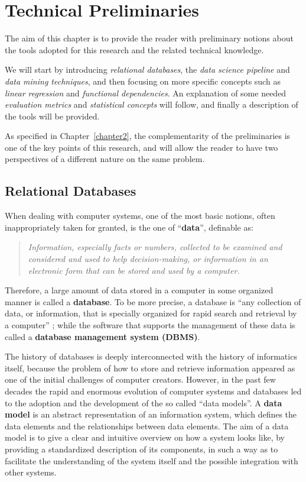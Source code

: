 \chapter{Technical Preliminaries}
\label{chapter4}
\thispagestyle{empty}

The aim of this chapter is to provide the reader with preliminary notions about the tools adopted for this research and the related technical knowledge.

We will start by introducing \textit{relational databases}, the \textit{data science pipeline} and \textit{data mining techniques}, and then focusing on more specific concepts such as \textit{linear regression} and \textit{functional dependencies}. An explanation of some needed \textit{evaluation metrics} and \textit{statistical concepts} will follow, and finally a description of the tools will be provided.

As specified in Chapter~\ref{chapter2}, the complementarity of the preliminaries is one of the key points of this research, and will allow the reader to have two perspectives of a different nature on the same problem.


\section{Relational Databases}
\label{section:relational_databases}
When dealing with computer systems, one of the most basic notions, often inappropriately taken for granted, is the one of ``\textbf{data}'', definable as:
\begin{quote}\emph{Information, especially facts or numbers, collected to be examined and considered and used to help decision-making, or information in an electronic form that can be stored and used by a computer.} \cite{cambridge2013data}\end{quote}
Therefore, a large amount of data stored in a computer in some organized manner is called a \textbf{database}. To be more precise, a database is ``any collection of data, or information, that is specially organized for rapid search and retrieval by a computer'' \cite{britannica2020database}; while the software that supports the management of these data is called a \textbf{database management system (DBMS)}.

The history of databases is deeply interconnected with the history of informatics itself, because the problem of how to store and retrieve information appeared as one of the initial challenges of computer creators. However, in the past few decades the rapid and enormous evolution of computer systems and databases led to the adoption and the development of the so called ``data models''. A \textbf{data model} \cite{abiteboul1995foundations} is an abstract representation of an information system, which defines the data elements and the relationships between data elements. The aim of a data model is to give a clear and intuitive overview on how a system looks like, by providing a standardized description of its components, in such a way as to facilitate the understanding of the system itself and the possible integration with other systems.

